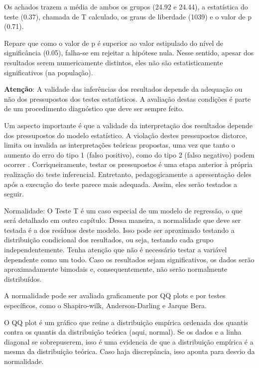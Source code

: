 \documentclass[
]{book}
\begin{document}
Os achados trazem a média de ambos os grupos (24.92 e 24.44), a estatística do teste (0.37), chamada de T calculado, os graus de liberdade (1039) e o valor de p (0.71).

Repare que como o valor de p é superior ao valor estipulado do nível de significância (0.05), falha-se em rejeitar a hipótese nula. Nesse sentido, apesar dos resultados serem numericamente distintos, eles não são estatisticamente significativos (na população).

\begin{warning}

\textbf{Atenção}: A validade das inferências dos resultados depende da adequação ou não dos pressupostos dos testes estatísticos. A avaliação destas condições é parte de um procedimento diagnóstico que deve ser sempre feito.

\end{warning}

Um aspecto importante é que a validade da interpretação dos resultados depende dos pressupostos do modelo estatístico. A violação destes pressupostos distorce, limita ou invalida as interpretações teóricas propostas, uma vez que tanto o aumento do erro do tipo 1 (falso positivo), como do tipo 2 (falso negativo) podem ocorrer \citep{Lix1996, Barker2015, Ernst2017}. Corriqueiramente, testar os pressupostos é uma etapa anterior à própria realização do teste inferencial. Entretanto, pedagogicamente a apresentação deles após a execução do teste parece mais adequada. Assim, eles serão testados a seguir.

Normalidade: O Teste T é um caso especial de um modelo de regressão, o que será detalhado em outro capítulo. Dessa maneira, a normalidade que deve ser testada é a dos resíduos deste modelo. Isso pode ser aproximado testando a distribuição condicional dos resultados, ou seja, testando cada grupo independentemente. Tenha atenção que não é necessário testar a variável dependente como um todo. Caso os resultados sejam significativos, os dados serão aproximadamente bimodais e, consequentemente, não serão normalmente distribuídos.

A normalidade pode ser avaliada graficamente por QQ plots e por testes específicos, como o Shapiro-wilk, Anderson-Darling e Jarque Bera.

O QQ plot é um gráfico que reúne a distribuição empírica ordenada dos quantis contra os quantis da distribuição teórica (aqui, normal). Se os dados e a linha diagonal se sobrepuserem, isso é uma evidencia de que a distribuição empírica é a mesma da distribuição teórica. Caso haja discrepância, isso aponta para desvio da normalidade.
\end{document}
